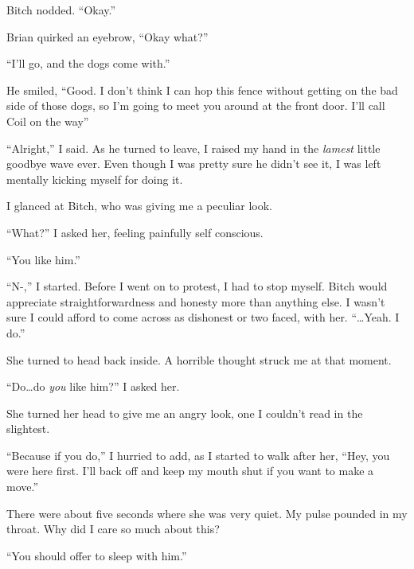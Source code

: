 Bitch nodded.  ``Okay.''



Brian quirked an eyebrow, ``Okay what?''



``I'll go, and the dogs come with.''



He smiled, ``Good.  I don't think I can hop this fence without getting on the bad side of those dogs, so I'm going to meet you around at the front door.  I'll call Coil on the way''



``Alright,'' I said.  As he turned to leave, I raised my hand in the \emph{lamest} little goodbye wave ever.  Even though I was pretty sure he didn't see it, I was left mentally kicking myself for doing it.



I glanced at Bitch, who was giving me a peculiar look.



``What?'' I asked her, feeling painfully self conscious.



``You like him.''



``N-,'' I started.  Before I went on to protest, I had to stop myself.  Bitch would appreciate straightforwardness and honesty more than anything else.  I wasn't sure I could afford to come across as dishonest or two faced, with her.  ``\ldots{}Yeah.  I do.''



She turned to head back inside.  A horrible thought struck me at that moment.



``Do\ldots do \emph{you} like him?'' I asked her.



She turned her head to give me an angry look, one I couldn't read in the slightest.



``Because if you do,'' I hurried to add, as I started to walk after her, ``Hey, you were here first.  I'll back off and keep my mouth shut if you want to make a move.''



There were about five seconds where she was very quiet.  My pulse pounded in my throat.  Why did I care so much about this?



``You should offer to sleep with him.''



